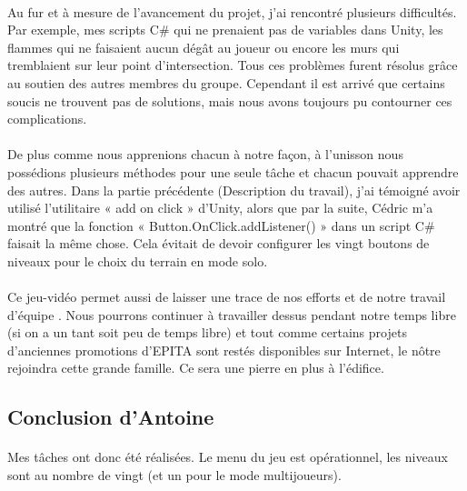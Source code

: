 \documentclass[titlepage, 13px, a4paper]{report}
\begin{document}
\paragraph{} \hspace{0pt}
Au fur et à mesure de l'avancement du projet, j'ai rencontré plusieurs difficultés.
Par exemple, mes scripts C\# qui ne prenaient pas de variables dans Unity, les
flammes qui ne faisaient aucun dégât au joueur ou encore les murs qui
tremblaient sur leur point d'intersection. Tous ces problèmes furent résolus grâce
au soutien des autres membres du groupe. Cependant il est arrivé que certains
soucis ne trouvent pas de solutions, mais nous avons toujours pu contourner ces
complications. \\

\paragraph{} \hspace{0pt} 
De plus comme nous apprenions chacun à notre façon, à l’unisson nous
possédions plusieurs méthodes pour une seule tâche et chacun pouvait apprendre
des autres. Dans la partie précédente (Description du travail), j'ai témoigné avoir
utilisé l'utilitaire « add on click » d'Unity, alors que par la suite, Cédric m'a montré
que la fonction « Button.OnClick.addListener() » dans un script C\# faisait la même chose. Cela évitait de devoir
configurer les vingt boutons de niveaux pour le choix du terrain en mode solo. \\

\paragraph{} \hspace{0pt} 
Ce jeu-vidéo permet aussi de laisser une trace de nos efforts et de notre travail
d'équipe . Nous pourrons continuer à travailler dessus pendant notre temps libre
(si on a un tant soit peu de temps libre) et tout comme certains projets d'anciennes
promotions d'EPITA sont restés disponibles sur Internet, le nôtre rejoindra cette
grande famille. Ce sera une pierre en plus à l'édifice. \\


\subsection{Conclusion d'Antoine}
\paragraph{} \hspace{0pt}
Mes tâches ont donc été réalisées. Le menu du jeu est opérationnel, les niveaux
sont au nombre de vingt (et un pour le mode multijoueurs). \\
\end{document}
